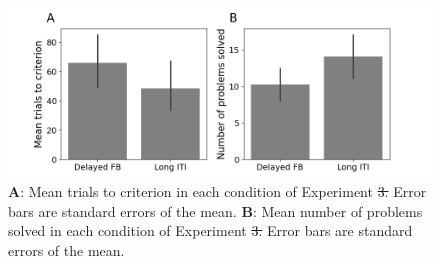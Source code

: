 \documentclass[doc, floatsintext]{apa7}
\providecommand{\DIFadd}[1]{{\protect\color{blue}\uwave{#1}}} %
\providecommand{\DIFdel}[1]{{\protect\color{red}\sout{#1}}}                      %
\providecommand{\DIFdelend}{} %
\providecommand{\DIFaddFL}[1]{\DIFadd{#1}} %
\providecommand{\DIFdelFL}[1]{\DIFdel{#1}} %
\providecommand{\DIFaddbeginFL}{} %
\providecommand{\DIFaddendFL}{} %
\providecommand{\DIFdelbeginFL}{} %
\providecommand{\DIFdelendFL}{} %
\newcommand{\DIFscaledelfig}{0.5}
\newlength{\DIFdelgraphicswidth} %
\newlength{\DIFdelgraphicsheight} %
\newcommand{\DIFaddincludegraphics}[2][]{{\color{blue}\fbox{\DIFOincludegraphics[#1]{#2}}}} %
\newcommand{\DIFdelincludegraphics}[2][]{%
\sbox{\DIFdelgraphicsbox}{\DIFOincludegraphics[#1]{#2}}%
\settoboxwidth{\DIFdelgraphicswidth}{\DIFdelgraphicsbox} %
\settoboxtotalheight{\DIFdelgraphicsheight}{\DIFdelgraphicsbox} %
\scalebox{\DIFscaledelfig}{%
\parbox[b]{\DIFdelgraphicswidth}{\usebox{\DIFdelgraphicsbox}\\[-\baselineskip] \rule{\DIFdelgraphicswidth}{0em}}\llap{\resizebox{\DIFdelgraphicswidth}{\DIFdelgraphicsheight}{%
\setlength{\unitlength}{\DIFdelgraphicswidth}%
\begin{picture}(1,1)%
\thicklines\linethickness{2pt} %
{\color[rgb]{1,0,0}\put(0,0){\framebox(1,1){}}}%
{\color[rgb]{1,0,0}\put(0,0){\line( 1,1){1}}}%
{\color[rgb]{1,0,0}\put(0,1){\line(1,-1){1}}}%
\end{picture}%
}\hspace*{3pt}}} %
} %
\DeclareRobustCommand{\DIFdelend}{\DIFOaddend \let\includegraphics\DIFOincludegraphics} %
\DeclareRobustCommand{\DIFaddbeginFL}{\DIFOaddbeginFL \let\includegraphics\DIFaddincludegraphics} %
\DeclareRobustCommand{\DIFaddendFL}{\DIFOaddendFL \let\includegraphics\DIFOincludegraphics} %
\DeclareRobustCommand{\DIFdelbeginFL}{\DIFOdelbeginFL \let\includegraphics\DIFdelincludegraphics} %
\DeclareRobustCommand{\DIFdelendFL}{\DIFOaddendFL \let\includegraphics\DIFOincludegraphics} %
\begin{document}
\DIFdelend \begin{figure}
  \centering
  \includegraphics[width=.8\textwidth]{../figures/fig_exp_2_t2c.png}
    \caption{
        \textbf{A}: Mean trials to criterion in each
        condition of Experiment \DIFdelbeginFL \DIFdelFL{3. }\DIFdelendFL \DIFaddbeginFL \DIFaddFL{2. }\DIFaddendFL Error bars are standard
        errors of the mean.
        \textbf{B}: Mean number of problems solved in each
        condition of Experiment \DIFdelbeginFL \DIFdelFL{3. }\DIFdelendFL \DIFaddbeginFL \DIFaddFL{2. }\DIFaddendFL Error bars are standard
        errors of the mean.
}
  \label{fig_exp_2_t2c}
\end{figure}
\end{document}
